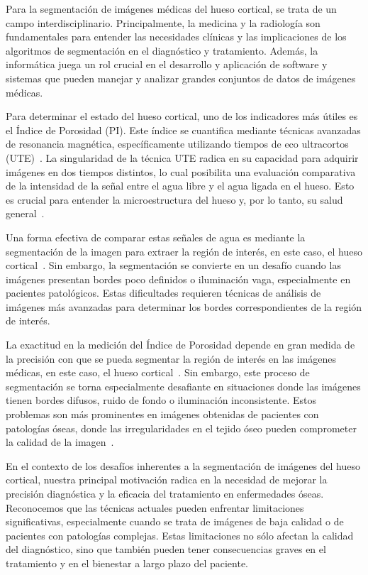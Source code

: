 \documentclass[conference]{IEEEtran}
\begin{document}
Para la segmentación de imágenes médicas del hueso cortical, se trata de un campo interdisciplinario. Principalmente, la medicina y la radiología son fundamentales para entender las necesidades clínicas y las implicaciones de los algoritmos de segmentación en el diagnóstico y tratamiento. Además, la informática juega un rol crucial en el desarrollo y aplicación de software y sistemas que pueden manejar y analizar grandes conjuntos de datos de imágenes médicas.

Para determinar el estado del hueso cortical, uno de los indicadores más útiles es el Índice de Porosidad (PI). Este índice se cuantifica mediante técnicas avanzadas de resonancia magnética, específicamente utilizando tiempos de eco ultracortos (UTE)~\cite{Jerban2023}. La singularidad de la técnica UTE radica en su capacidad para adquirir imágenes en dos tiempos distintos, lo cual posibilita una evaluación comparativa de la intensidad de la señal entre el agua libre y el agua ligada en el hueso. Esto es crucial para entender la microestructura del hueso y, por lo tanto, su salud general~\cite{Surowiec2021,Jerban2023}.

Una forma efectiva de comparar estas señales de agua es mediante la segmentación de la imagen para extraer la región de interés, en este caso, el hueso cortical~\cite{segmentation_bandyopadhyay_2021}. Sin embargo, la segmentación se convierte en un desafío cuando las imágenes presentan bordes poco definidos o iluminación vaga, especialmente en pacientes patológicos. Estas dificultades requieren técnicas de análisis de imágenes más avanzadas para determinar los bordes correspondientes de la región de interés.

La exactitud en la medición del Índice de Porosidad depende en gran medida de la precisión con que se pueda segmentar la región de interés en las imágenes médicas, en este caso, el hueso cortical~\cite{nyman2008measurements}. Sin embargo, este proceso de segmentación se torna especialmente desafiante en situaciones donde las imágenes tienen bordes difusos, ruido de fondo o iluminación inconsistente. Estos problemas son más prominentes en imágenes obtenidas de pacientes con patologías óseas, donde las irregularidades en el tejido óseo pueden comprometer la calidad de la imagen~\cite{segmentation_bandyopadhyay_2021}.

En el contexto de los desafíos inherentes a la segmentación de imágenes del hueso cortical, nuestra principal motivación radica en la necesidad de mejorar la precisión diagnóstica y la eficacia del tratamiento en enfermedades óseas. Reconocemos que las técnicas actuales pueden enfrentar limitaciones significativas, especialmente cuando se trata de imágenes de baja calidad o de pacientes con patologías complejas. Estas limitaciones no sólo afectan la calidad del diagnóstico, sino que también pueden tener consecuencias graves en el tratamiento y en el bienestar a largo plazo del paciente.
\end{document}
